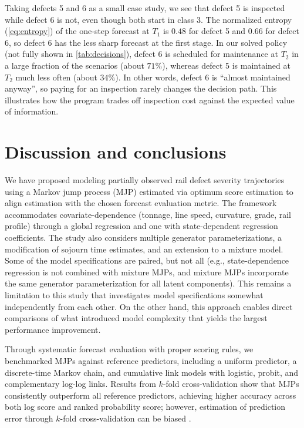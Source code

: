 \documentclass{article}
\begin{document}
Taking defects 5 and 6 as a small case study, we see that defect 5 is inspected while defect 6 is not, even though both start in class $3$. The normalized entropy (\cref{eq:entropy}) of the one-step forecast at $T_1$ is $0.48$ for defect 5 and $0.66$ for defect 6, so defect 6 has the less sharp forecast at the first stage. In our solved policy (not fully shown in \cref{tab:decisions}), defect 6 is scheduled for maintenance at $T_2$ in a large fraction of the scenarios (about $71\%$), whereas defect 5 is maintained at $T_2$ much less often (about $34\%$). In other words, defect 6 is ``almost maintained anyway'', so paying for an inspection rarely changes the decision path. This illustrates how the program trades off inspection cost against the expected value of information.







\section{Discussion and conclusions} \label{sec:conclusion}
We have proposed modeling partially observed rail defect severity trajectories using a Markov jump process (MJP) estimated via optimum score estimation to align estimation with the chosen forecast evaluation metric. The framework accommodates covariate-dependence (tonnage, line speed, curvature, grade, rail profile) through a global regression and one with state-dependent regression coefficients. The study also considers multiple generator parameterizations, a modification of sojourn time estimates, and an extension to a mixture model.
Some of the model specifications are paired, but not all (e.g., state-dependence regression is not combined with mixture MJPs, and mixture MJPs incorporate the same generator parameterization for all latent components). This remains a limitation to this study that investigates model specifications somewhat independently from each other. On the other hand, this approach enables direct comparisons of what introduced model complexity that yields the largest performance improvement.

Through systematic forecast evaluation with proper scoring rules, we benchmarked MJPs against reference predictors, including a uniform predictor, a discrete-time Markov chain, and cumulative link models with logistic, probit, and complementary log-log links. Results from $k$-fold cross-validation show that MJPs consistently outperform all reference predictors, achieving higher accuracy across both log score and ranked probability score; however, estimation of prediction error through $k$-fold cross-validation can be biased \citep{fushiki2011a}.
\end{document}

